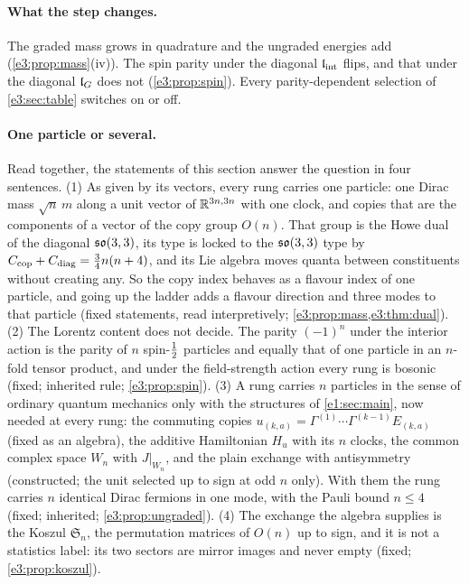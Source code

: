 \paragraph{What the step changes.} The graded mass grows in quadrature and the ungraded energies add (\cref{e3:prop:mass}(iv)). The spin parity
under the diagonal $\mathfrak l_{\rm int}$ flips, and that under the diagonal $\mathfrak l_G$ does not (\cref{e3:prop:spin}). Every parity-dependent selection of
\cref{e3:sec:table} switches on or off.

\paragraph{One particle or several.} Read together, the statements of this section answer the question in four sentences. (1) As given by
its vectors, every rung carries one particle: one Dirac mass $\sqrt n\,m$ along a unit vector of $\mathbb{R}^{3n,3n}$ with one clock, and copies
that are the components of a vector of the copy group $O(n)$. That group is the Howe dual of the diagonal $\mathfrak{so}(3,3)$, its type is locked to
the $\mathfrak{so}(3,3)$ type by $C_{\rm cop}+C_{\rm diag}=\tfrac34n(n+4)$, and its Lie algebra moves quanta between constituents without creating any. So
the copy index behaves as a flavour index of one particle, and going up the ladder adds a flavour direction and three modes to that particle
(fixed statements, read interpretively; \cref{e3:prop:mass,e3:thm:dual}). (2) The Lorentz content does not decide. The parity $(-1)^n$ under
the interior action is the parity of $n$ spin-$\tfrac12$ particles and equally that of one particle in an $n$-fold tensor product, and under
the field-strength action every rung is bosonic (fixed; inherited rule; \cref{e3:prop:spin}). (3) A rung carries $n$ particles in the sense of
ordinary quantum mechanics only with the structures of \cref{e1:sec:main}, now needed at every rung: the commuting copies
$u_{(k,a)}=\Gamma^{(1)}\cdots\Gamma^{(k-1)}E_{(k,a)}$ (fixed as an algebra), the additive Hamiltonian $H_u$ with its $n$ clocks, the common complex
space $W_n$ with $J|_{W_n}$, and the plain exchange with antisymmetry (constructed; the unit selected up to sign at odd $n$ only). With them
the rung carries $n$ identical Dirac fermions in one mode, with the Pauli bound $n\le4$ (fixed; inherited; \cref{e3:prop:ungraded}). (4) The
exchange the algebra supplies is the Koszul $\mathfrak S_n$, the permutation matrices of $O(n)$ up to sign, and it is not a statistics label: its
two sectors are mirror images and never empty (fixed; \cref{e3:prop:koszul}).

